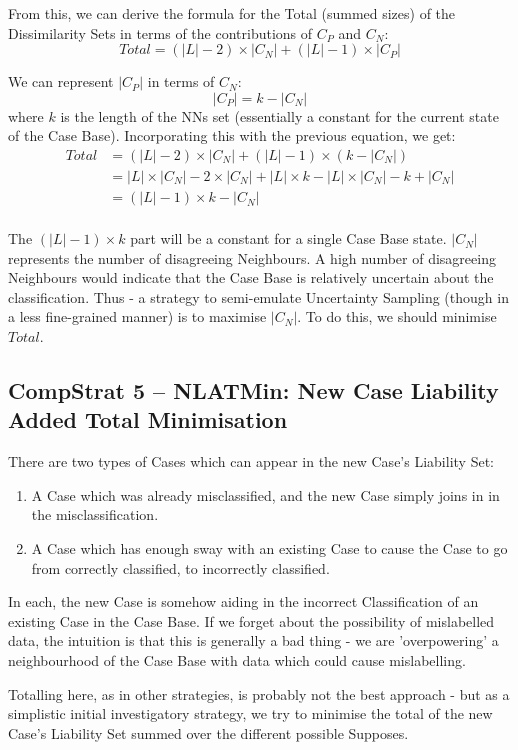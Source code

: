 \documentclass[a4paper,11pt]{report}
\begin{document}
From this, we can derive the formula for the Total (summed sizes) of the Dissimilarity Sets in terms of the contributions of $C_{P}$ and $C_{N}$:
\[ Total= (|L| - 2)\times |C_{N}| +(|L| - 1)\times |C_{P}|  \] 

We can represent $|C_{P}|$ in terms of $C_{N}$:
\[ |C_{P}| = k -  |C_{N}| \]
where $k$ is the length of the NNs set (essentially a constant for the current state of the Case Base). Incorporating this with the previous equation, we get:
\begin{align*}
Total &= (|L| - 2)\times |C_{N}| +(|L| - 1)\times (k - |C_{N}|) \\
&= |L| \times |C_{N}| - 2\times|C_{N}| + |L|\times k - |L| \times |C_{N}| - k + |C_{N}| \\
&= (|L| - 1) \times k - |C_{N}| \\
\end{align*} 

The $ (|L| - 1) \times k $ part will be a constant for a single Case Base state. $|C_{N}|$ represents the number of disagreeing Neighbours. A high number of disagreeing Neighbours would indicate that the Case Base is relatively uncertain about the classification. Thus - a strategy to semi-emulate Uncertainty Sampling (though in a less fine-grained manner) is to maximise $|C_{N}|$. To do this, we should minimise $Total$.

\subsection{CompStrat 5 – NLATMin: New Case Liability Added Total Minimisation}
There are two types of Cases which can appear in the new Case's Liability Set:
\begin{enumerate}
	\item A Case which was already misclassified, and the new Case simply joins in in the misclassification.
	\item A Case which has enough sway with an existing Case to cause the Case to go from correctly classified, to incorrectly classified.
\end{enumerate}

In each, the new Case is somehow aiding in the incorrect Classification of an existing Case in the Case Base. If we forget about the possibility of mislabelled data, the intuition is that this is generally a bad thing - we are 'overpowering' a neighbourhood of the Case Base with data which could cause mislabelling.

Totalling here, as in other strategies, is probably not the best approach - but as a simplistic initial investigatory strategy, we try to minimise the total of the new Case's Liability Set summed over the different possible Supposes.
\end{document}
